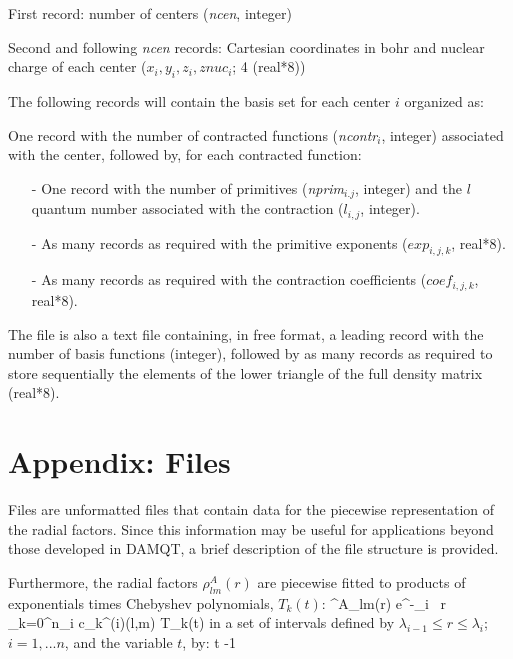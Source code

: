 \documentclass[10pt]{article}
\begin{document}
First record: number of centers ({\it ncen}, integer)

Second and following {\it ncen} records: Cartesian coordinates in bohr and
nuclear charge of each center ($x_i, y_i, z_i, znuc_i$; 4 (real*8))

The following records will contain the basis set for each center $i$
organized as:

One record with the number of contracted functions ({\it ncontr$_i$}, integer)
associated with the center, followed by, for each contracted function:

\begin{itemize}
\item[-] One record with the number of primitives ({\it nprim$_{i.j}$}, integer)
and the $l$ quantum number associated with the contraction ({$l_{i,j}$}, integer).
\item[-] As many records as required with the primitive exponents
($exp_{i,j,k}$, real*8).
\item[-] As many records as required with the contraction coefficients
($coef_{i,j,k}$, real*8).
\end{itemize}

The \den{ } file is also a text file containing,
in free format, a leading record with the number of basis functions (integer),
followed by as many records as required to store sequentially the elements 
of the lower triangle of the full density matrix (real*8).


\section{Appendix: Files \damqt\label{A2}}

Files \damqt{} are unformatted files
that contain data for the
piecewise representation of the radial factors. Since this information may be
useful for applications beyond those developed in DAMQT, a brief
description of the file structure is provided.

Furthermore, the radial factors $\rho^A_{lm}(r)$ are piecewise fitted
to products of exponentials times Chebyshev polynomials, $T_k(t)$:
%
\be \label{eq:A2.1}
\rho^A_{lm}(r) \simeq e^{-\xi_i \, r} \; \sum_{k=0}^{n_i} c_k^{(i)}(l,m) \;
T_k(t)
\ee
%
in a set of intervals defined by $\lambda_{i-1} \le r \le \lambda_i$;  $i = 1, ...
n$, and the variable $t$, by:
%
\be   \label{eq:A2.2}
t  \; -1
\ee
%
\end{document}
